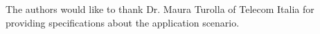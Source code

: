 \begin{acks}
The authors would like to thank Dr. Maura Turolla of Telecom
Italia for providing specifications about the application scenario.
\end{acks}


